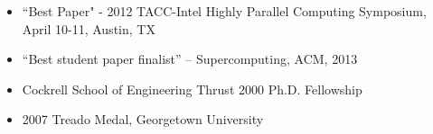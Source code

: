 \vspace{-0.3in}

\begin{itemize}
	\itemsep 0pt
	\item ``Best Paper" - 2012 TACC-Intel Highly Parallel Computing Symposium, April 10-11, Austin, TX
        \item ``Best student paper finalist'' -- Supercomputing, ACM, 2013
        \item Cockrell School of Engineering Thrust 2000 Ph.D. Fellowship
        \item 2007 Treado Medal, Georgetown University      
\end{itemize}


